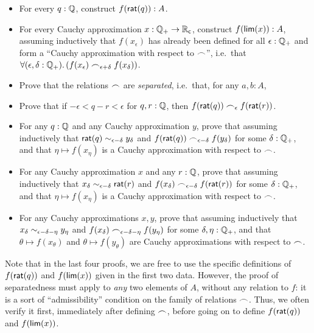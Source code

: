 \begin{itemize}
\item For every $q : \mathbb{Q}$, construct $f(\mathsf{rat}(q)) : A$.
\item For every Cauchy approximation $x : \mathbb{Q}_{+} \to \mathbb{R}_\mathsf{c}$, construct $f(\mathsf{lim}(x)) : A$, assuming inductively that $f(x_\epsilon)$ has already been defined for all $\epsilon : \mathbb{Q}_{+}$ and form a ``Cauchy approximation with respect to $\frown$'', i.e.\ that $\fall{\epsilon,\delta:\Qp} (f(x_\epsilon) \bsim_{\epsilon+\delta} f(x_\delta))$.
\item Prove that the relations $\frown$ are \emph{separated}, i.e.\ that, for any $a,b:A$,
\item Prove that if $-\epsilon< q-r <\epsilon$ for $q,r:\mathbb{Q}$, then $f(\mathsf{rat}(q))\frown_\epsilon f(\mathsf{rat}(r))$.
\item For any $q:\mathbb{Q}$ and any Cauchy approximation $y$, prove that
 assuming inductively that $\mathsf{rat}(q)\sim_{\epsilon-\delta} y_\delta$ and $f(\mathsf{rat}(q)) \frown_{\epsilon-\delta} f(y_\delta)$ for some $\delta:\mathbb{Q}_{+}$, and that $\eta \mapsto f(x_\eta)$ is a Cauchy approximation with respect to $\frown$.
\item For any Cauchy approximation $x$ and any $r:\mathbb{Q}$, prove that
assuming inductively that $x_\delta \sim_{\epsilon-\delta} \mathsf{rat}(r)$ and $f(x_\delta) \frown_{\epsilon-\delta} f(\mathsf{rat}(r))$ for some $\delta:\mathbb{Q}_{+}$, and that $\eta\mapsto f(x_\eta)$ is a Cauchy approximation with respect to $\frown$.
\item For any Cauchy approximations $x,y$, prove that
assuming inductively that $x_\delta \sim_{\epsilon-\delta-\eta} y_\eta$ and $f(x_\delta) \frown_{\epsilon-\delta-\eta} f(y_\eta)$ for some $\delta,\eta:\mathbb{Q}_{+}$, and that $\theta\mapsto f(x_\theta)$ and $\theta\mapsto f(y_\theta)$ are Cauchy approximations with respect to $\frown$.
\end{itemize}
Note that in the last four proofs, we are free to use the specific definitions of $f(\mathsf{rat}(q))$ and $f(\mathsf{lim}(x))$ given in the first two data.
However, the proof of separatedness must apply to \emph{any} two elements of $A$, without any relation to $f$: it is a sort of ``admissibility'' condition on the family of relations $\frown$.
Thus, we often verify it first, immediately after defining $\frown$, before going on to define $f(\mathsf{rat}(q))$ and $f(\mathsf{lim}(x))$.

